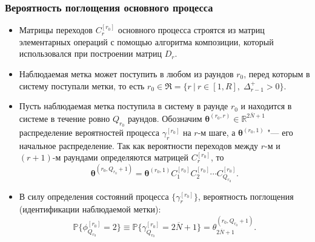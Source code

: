 \begin{frame}
    \frametitle{Вероятность поглощения основного процесса}
    \footnotesize
    \begin{itemize}
        \item Матрицы переходов $C_r^{[r_0]}$ основного процесса строятся из матриц элементарных операций с помощью алгоритма композиции, который использовался при построении матриц $D_r$.
        \item Наблюдаемая метка может поступить в любом из раундов $r_0$, перед которым в систему поступали метки, то есть $r_0 \in \mathfrak{R} = \{ r\:|\:r \in [1, R],\; \Delta_{r-1}^+ > 0 \}$.
        \item Пусть наблюдаемая метка поступила в систему в раунде $r_0$ и находится в системе в течение ровно $Q_{r_0}$ раундов. Обозначим $\bm{\theta}^{(r_0,r)} \in \mathbb{R}^{2\overline{N}+1}$ распределение вероятностей процесса $\gamma_r^{[r_0]}$ на $r$-м шаге, а $\bm{\theta}^{(r_0,1)}$ "--- его начальное распределение. Так как вероятности переходов между $r$-м и $(r+1)$-м раундами определяются матрицей $C_r^{[r_0]}$, то
        $$
        \bm{\theta}^{(r_0, Q_{r_0} + 1)} = \bm{\theta}^{(r_0, 1)} C^{[r_0]}_1 C^{[r_0]}_2 \cdots C^{[r_0]}_{Q_{r_0}}.
        $$
        \item В силу определения состояний процесса $\{ \gamma_r^{[r_0]} \}$, вероятность поглощения (идентификации наблюдаемой метки):
        $$
	        \mathbb{P}\{ \phi_{Q_{r_0}}^{[r_0]} = 2 \} \equiv \mathbb{P}\{ \gamma_{Q_{r_0}}^{[r_0]} = 2\overline{N}+1 \} = \theta_{2\overline{N}+1}^{(r_0, Q_{r_0}+1)}.
        $$
    \end{itemize}
\end{frame}

